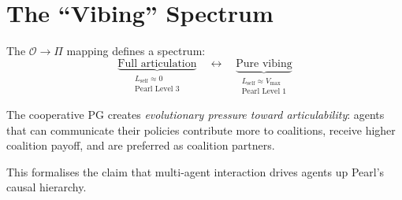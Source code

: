 \section{The ``Vibing'' Spectrum}

The $\mathcal{O} \to \Pi$ mapping defines a spectrum:
\[
    \underbrace{\text{Full articulation}}_{\substack{L_{\text{self}} \approx 0 \\ \text{Pearl Level 3}}}
    \quad\longleftrightarrow\quad
    \underbrace{\text{Pure vibing}}_{\substack{L_{\text{self}} \approx V_{\max} \\ \text{Pearl Level 1}}}
\]

The cooperative PG creates \emph{evolutionary pressure toward articulability}: agents that can communicate their policies contribute more to coalitions, receive higher coalition payoff, and are preferred as coalition partners.

This formalises the claim that multi-agent interaction drives agents up Pearl's causal hierarchy.
